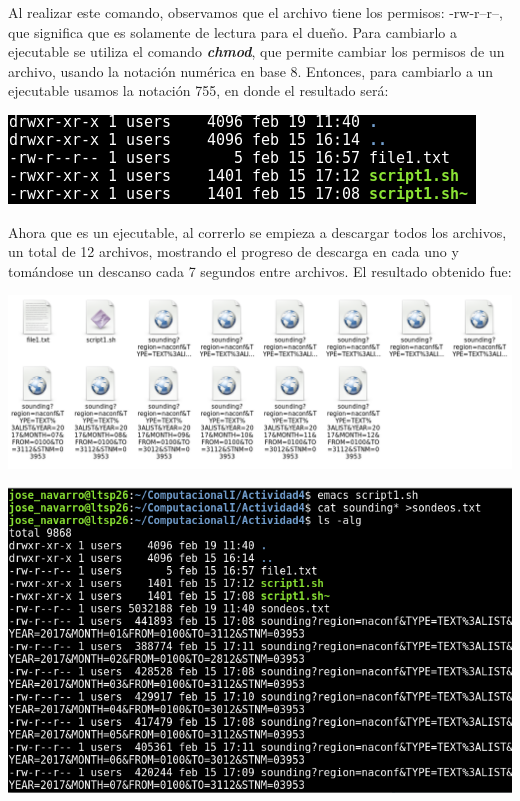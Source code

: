 \documentclass[12pt]{article}
\begin{document}
Al realizar este comando, observamos que el archivo tiene los permisos:  -rw-r--r--, que significa que es solamente de lectura para el dueño. Para cambiarlo a ejecutable se utiliza  el comando  \textbf{\textit{chmod}}, que permite cambiar los permisos de un archivo, usando la notación numérica en base 8. Entonces, para cambiarlo a un ejecutable usamos la notación 755, en donde el resultado será:

\begin{center}
\includegraphics[scale=0.7]{ejecutable.png}
\end{center} 

Ahora que es un ejecutable, al correrlo se empieza a descargar todos los archivos, un total de 12 archivos, mostrando el progreso de descarga en cada uno y tomándose un descanso cada 7 segundos entre archivos. El resultado obtenido fue:

\begin{center}
\includegraphics[scale=0.45]{Archivos.png}
\end{center} 

\begin{center}
\includegraphics[scale=0.55]{ls_-alg.png}
\end{center} 
\end{document}
